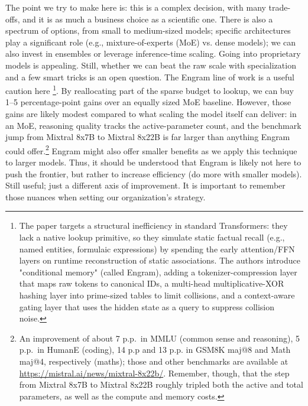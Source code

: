 The point we try to make here is: this is a complex decision, with many trade-offs, and it is as much a business choice as a scientific one. There is also a spectrum of options, from small to medium-sized models; specific architectures play a significant role (e.g., mixture-of-experts (MoE) vs. dense models); we can also invest in ensembles or leverage inference-time scaling. Going into proprietary models is appealing.
Still, whether we can beat the raw scale with specialization and a few smart tricks is an open question. The Engram line of work is a useful caution here \cite{2601.07372}\footnote{%
    The paper targets a structural inefficiency in standard Transformers: they lack a native lookup primitive, so they simulate static factual recall (e.g., named entities, formulaic expressions) by spending the early attention/FFN layers on runtime reconstruction of static associations. The authors introduce "conditional memory" (called Engram), adding a tokenizer-compression layer that maps raw tokens to canonical IDs, a multi-head multiplicative-XOR hashing layer into prime-sized tables to limit collisions, and a context-aware gating layer that uses the hidden state as a query to suppress collision noise.
    }.
By reallocating part of the sparse budget to lookup, we can buy 1--5 percentage-point gains over an equally sized MoE baseline. However, those gains are likely modest compared to what scaling the model itself can deliver: in an MoE, reasoning quality tracks the active-parameter count, and the benchmark jump from Mixtral 8x7B to Mixtral 8x22B is far larger than anything Engram could offer.\footnote{
    An improvement of about 7 p.p.\ in MMLU (common sense and reasoning), 5 p.p.\ in HumanE (coding), 14 p.p and 13 p.p. in GSM8K maj@8 and Math maj@4, respectively (maths); those and other benchmarks are available at 
    \url{https://mistral.ai/news/mixtral-8x22b/}.
    Remember, though, that the step from Mixtral 8x7B to Mixtral 8x22B roughly tripled both the active and total parameters, as well as the compute and memory costs.}
Engram might also offer smaller benefits as we apply this technique to larger models. Thus, it should be understood that Engram is likely not here to push the frontier, but rather to increase efficiency (do more with smaller models). Still useful; just a different axis of improvement. It is important to remember those nuances when setting our organization's strategy.

